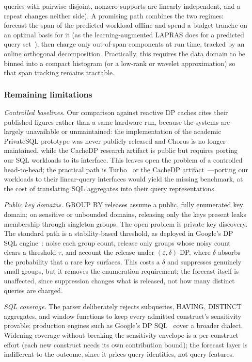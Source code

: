 \documentclass[sigconf,nonacm]{acmart}
\newcommand{\eps}{\varepsilon}
\begin{document}
queries with pairwise disjoint, nonzero supports are linearly independent, and a repeat changes neither side). A promising path combines the two regimes: forecast the span of the predicted workload offline and spend a budget tranche on an optimal basis for it (as the learning-augmented LAPRAS does for a predicted query set~\cite{mundra2026lapras}), then charge only out-of-span components at run time, tracked by an online orthogonal decomposition. Practically, this requires the data domain to be binned into a compact histogram (or a low-rank or wavelet approximation) so that span tracking remains tractable.

\subsubsection*{Remaining limitations}
\emph{Controlled baselines.} Our comparison against reactive DP caches cites their published figures rather than a same-hardware run, because the systems are largely unavailable or unmaintained: the implementation of the academic PrivateSQL prototype was never publicly released and Chorus is no longer maintained, while the CacheDP research artifact is public but requires porting our SQL workloads to its interface. This leaves open the problem of a controlled head-to-head; the practical path is Turbo~\cite{kostopoulou2023turbo} or the CacheDP artifact~\cite{mazmudar2023cachedp}---porting our workloads to their linear-query interfaces would yield the missing benchmark, at the cost of translating SQL aggregates into their query representations.

\emph{Public key domains.} GROUP BY releases assume a public, fully enumerated key domain; on sensitive or unbounded domains, releasing only the keys present leaks membership through singleton groups. The open problem is private key discovery. The standard path is a stability-based threshold, as deployed in Google's DP SQL engine~\cite{wilson2020googledp}: noise each group count, release only groups whose noisy count clears a threshold $\tau$, and account the release under $(\eps,\delta)$-DP, where $\delta$ absorbs the probability that a rare key surfaces. This costs a $\delta$ and suppresses genuinely small groups, but it removes the enumeration requirement; the forecast itself is unaffected, since suppression changes what is released, not how many distinct queries are charged.

\emph{SQL coverage.} The parser deliberately rejects subqueries, HAVING, DISTINCT aggregates, and window functions to keep every admitted construct's sensitivity provable; production engines such as Google's DP SQL~\cite{wilson2020googledp} cover a broader dialect. Widening coverage without breaking the sensitivity envelope is a per-construct effort (each new construct needs its own contribution bound); the forecast layer is indifferent to the outcome, since it prices query identities, not query features.
\end{document}
